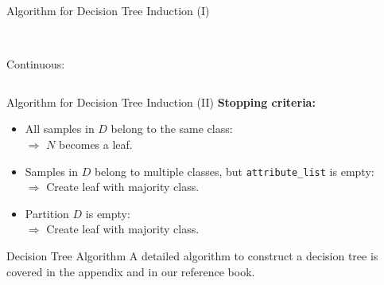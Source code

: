 \begin{frame}{Algorithm for Decision Tree Induction (I)}
\begin{columns}
\begin{column}{0.2\textwidth}
			~ \\\bigskip
			Continuous:
			\begin{figure}[t]
				\centering
				
			\end{figure}

		\end{column}
	\end{columns}


\end{frame}

\begin{frame}{Algorithm for Decision Tree Induction (II)}
	\textbf{Stopping criteria:}
	\begin{itemize}
		\item All samples in $D$ belong to the same class: \\
		      $\Rightarrow$ $N$ becomes a leaf.
		\item Samples in $D$ belong to multiple classes, but \texttt{attribute\_list} is empty: \\
		      $\Rightarrow$ Create leaf with majority class.
		\item Partition $D$ is empty: \\
		      $\Rightarrow$ Create leaf with majority class.
	\end{itemize}
	\vfill
	\begin{alertblock}{Decision Tree Algorithm}
		A detailed algorithm to construct a decision tree is covered in the appendix and in our reference book.
	\end{alertblock}
\end{frame}


